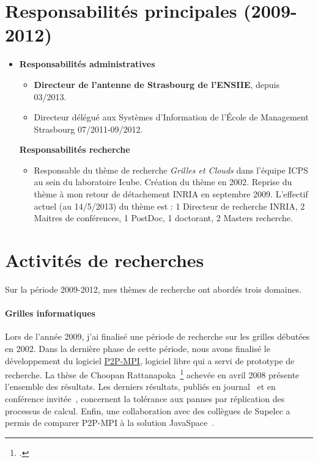 \documentclass[11pt]{article}
\newcommand{\pmpi}{\mbox{\textsc{P2P-MPI}}}
\begin{document}

\section{Responsabilités principales (2009-2012)}
\vspace{3mm}
\medskip

\begin{itemize}
\item
 	\textbf{Responsabilités administratives}\\
	\begin{itemize}
		\item \textbf{Directeur de l'antenne de Strasbourg de l'ENSIIE}, depuis 03/2013.
		\item Directeur délégué aux Systèmes d'Information de 
		      l'\'Ecole de Management Strasbourg 07/2011-09/2012.\\
	\end{itemize}


 	\textbf{Responsabilités recherche}
	\begin{itemize}
		\item Responsable du thème de recherche \textit{Grilles et Clouds} dans 
		      l'équipe ICPS au sein du laboratoire Icube. Création du thème en 2002. 
	              Reprise du thème à mon retour de détachement INRIA en septembre 2009.
                      L'effectif actuel (au 14/5/2013) du thème est : 1 Directeur de recherche 
                      INRIA, 2 Maitres de conférences, 1 PostDoc, 1 doctorant, 2 Masters recherche.
	\end{itemize}
\end{itemize}


\newpage
\section{Activités de recherches}

Sur la période 2009-2012, mes thèmes de recherche ont abordés trois domaines.

\paragraph{Grilles informatiques}
Lors de  l'année 2009, j'ai  finalisé une période  de recherche sur  les grilles
débutées en 2002.  Dans la dernière  phase de cette période, nous avons finalisé
le développement du logiciel \href{http://www.p2pmpi.org}{\pmpi}, logiciel libre
qui   a   servi   de   prototype    de   recherche.    La   thèse   de   Choopan
Rattanapoka~\footcite{icps-2008-208} achevée  en avril 2008  présente l'ensemble
des résultats.  Les derniers résultats, publiés  en journal~\cite{icps-2009-217}
et  en  conférence  invitée\cite{icps-2009-214}~, concernent  la  tolérance  aux
pannes par  réplication des processus  de calcul. Enfin, une  collaboration avec
des  collègues  de   Supelec  a  permis  de  comparer  {\pmpi}   à  la  solution
JavaSpace~\cite{icps-2009-217}.
\end{document}
